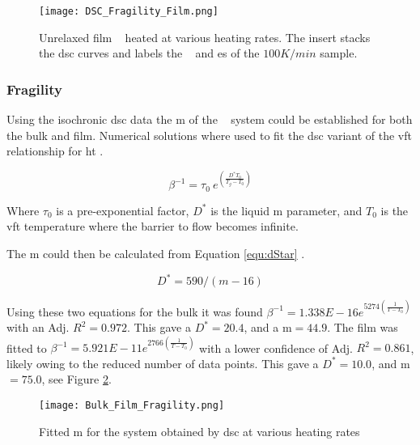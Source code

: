 \documentclass[draft,a4paper,12pt,oneside]{article}%
\begin{document}
\begin{figure}[b]
	\centering
	\texttt{[image: DSC\_Fragility\_Film.png]}
	\caption[Table of contents Capition]{Unrelaxed film \MgZnCa~ heated at various heating rates. The insert stacks the \gls{dsc} curves and labels the \Tg~ and \Tx es of the $100 K/min$ sample.}%
	\label{fig:DSC_vHeatingRate_Film}
\end{figure}

\subsubsection{Fragility}

Using the isochronic \acrshort{dsc} data the \gls{m} of the \MgZnCa~ system could be established for both the bulk and film. Numerical solutions where used to fit the \acrshort{dsc} variant of the \gls{vft} relationship for \gls{ht} \cite{Busch1998}.

\begin{equation}
	\beta^{-1} = \tau_{0}~ e^{(\frac{D^{*}T_{0}}{T_{g}-T_{0}})}
	\label{equ:VFT}
\end{equation}

Where $\tau_{0}$ is a pre-exponential factor, $D^{*}$ is the liquid \acrlong{m} parameter, and $T_{0}$ is the \gls{vft} temperature where the barrier to flow becomes infinite.

The \gls{m} could then be calculated from Equation \ref{equ:dStar} \cite{Angell2002, Wei2014}.

\begin{equation}
	D^{*}=590/(m-16)
	\label{equ:dStar}
\end{equation}

Using these two equations for the bulk it was found $\beta^{-1} = 1.338E - 16e^{5274 (\frac{1}{T-T_{0}})}$ with an Adj. $R^{2}=0.972$. This gave a $D^{*}=20.4$, and a \gls{m}$=44.9$. The film was fitted to $\beta^{-1} = 5.921E - 11e^{2766 (\frac{1}{T-T_{0}})}$ with a lower confidence of Adj. $R^{2}=0.861$, likely owing to the reduced number of data points. This gave a $D^{*}=10.0$, and \gls{m}$=75.0$, see Figure \ref{fig:Fragility_BulkFilm_mValue}.

\begin{figure}[b]
	\centering
	\texttt{[image: Bulk\_Film\_Fragility.png]}
	\caption[Table of contents Capition]{Fitted \acrfull{m} for the \MgZnCa system obtained by \acrshort{dsc} at various heating rates}
	\label{fig:Fragility_BulkFilm_mValue}
\end{figure}
\end{document}
